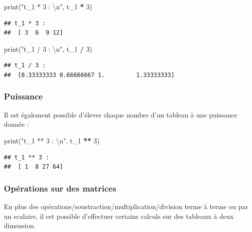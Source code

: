 \documentclass[
  12pt,
]{book}
\newenvironment{Shaded}{\begin{snugshade}}{\end{snugshade}}
\newcommand{\BuiltInTok}[1]{#1}
\newcommand{\CharTok}[1]{\textcolor[rgb]{0.31,0.60,0.02}{#1}}
\newcommand{\DecValTok}[1]{\textcolor[rgb]{0.00,0.00,0.81}{#1}}
\newcommand{\NormalTok}[1]{#1}
\newcommand{\OperatorTok}[1]{\textcolor[rgb]{0.81,0.36,0.00}{\textbf{#1}}}
\newcommand{\StringTok}[1]{\textcolor[rgb]{0.31,0.60,0.02}{#1}}
\numberwithin{equation}{section}
\numberwithin{countremarque}{section}
\begin{document}
\begin{Shaded}
\begin{Highlighting}[]
\BuiltInTok{print}\NormalTok{(}\StringTok{"t\_1 * 3 : }\CharTok{\textbackslash{}n}\StringTok{"}\NormalTok{, t\_1 }\OperatorTok{*} \DecValTok{3}\NormalTok{)}
\end{Highlighting}
\end{Shaded}

\begin{lstlisting}
## t_1 * 3 : 
##  [ 3  6  9 12]
\end{lstlisting}

\begin{Shaded}
\begin{Highlighting}[]
\BuiltInTok{print}\NormalTok{(}\StringTok{"t\_1 / 3 : }\CharTok{\textbackslash{}n}\StringTok{"}\NormalTok{, t\_1 }\OperatorTok{/} \DecValTok{3}\NormalTok{)}
\end{Highlighting}
\end{Shaded}

\begin{lstlisting}
## t_1 / 3 : 
##  [0.33333333 0.66666667 1.         1.33333333]
\end{lstlisting}

\subsubsection{Puissance}\label{puissance-1}

Il est également possible d'élever chaque nombre d'un tableau à une puissance donnée :

\begin{Shaded}
\begin{Highlighting}[]
\BuiltInTok{print}\NormalTok{(}\StringTok{"t\_1 ** 3 : }\CharTok{\textbackslash{}n}\StringTok{"}\NormalTok{, t\_1 }\OperatorTok{**} \DecValTok{3}\NormalTok{)}
\end{Highlighting}
\end{Shaded}

\begin{lstlisting}
## t_1 ** 3 : 
##  [ 1  8 27 64]
\end{lstlisting}

\subsubsection{Opérations sur des matrices}\label{opuxe9rations-sur-des-matrices}

En plus des opérations/soustraction/multiplication/division terme à terme ou par un scalaire, il est possible d'effectuer certains calculs sur des tableaux à deux dimension.
\end{document}
